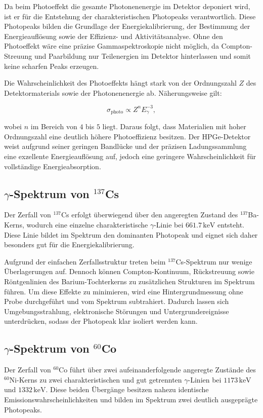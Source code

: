 Da beim Photoeffekt die gesamte Photonenenergie im Detektor deponiert wird, ist er für die
Entstehung der charakteristischen Photopeaks verantwortlich. Diese Photopeaks bilden die
Grundlage der Energiekalibrierung, der Bestimmung der Energieauflösung sowie der
Effizienz- und Aktivitätsanalyse. Ohne den Photoeffekt wäre eine präzise Gammaspektroskopie
nicht möglich, da Compton-Streuung und Paarbildung nur Teilenergien im Detektor
hinterlassen und somit keine scharfen Peaks erzeugen.

Die Wahrscheinlichkeit des Photoeffekts hängt stark von der Ordnungszahl $Z$ des
Detektormaterials sowie der Photonenenergie ab. Näherungsweise gilt:

\[
\sigma_{\mathrm{photo}} \propto Z^n E_\gamma^{-3},
\]

wobei $n$ im Bereich von $4$ bis $5$ liegt. Daraus folgt, dass Materialien mit hoher
Ordnungszahl eine deutlich höhere Photoeffizienz besitzen. Der HPGe-Detektor weist aufgrund seiner geringen Bandlücke und der präzisen Ladungssammlung eine exzellente Energieauflösung auf, jedoch eine geringere Wahrscheinlichkeit für vollständige Energieabsorption.

\subsection{$\gamma$-Spektrum von $^{137}$Cs}

Der Zerfall von $^{137}$Cs erfolgt überwiegend über den angeregten Zustand des
$^{137}$Ba-Kerns, wodurch eine einzelne charakteristische $\gamma$-Linie bei
$661.7\,\mathrm{keV}$ entsteht. Diese Linie bildet im Spektrum den dominanten
Photopeak und eignet sich daher besonders gut für die Energiekalibrierung.

Aufgrund der einfachen Zerfallsstruktur treten beim $^{137}$Cs-Spektrum nur
wenige Überlagerungen auf. Dennoch können Compton-Kontinuum, Rückstreuung
sowie Röntgenlinien des Barium-Tochterkerns zu zusätzlichen Strukturen im
Spektrum führen. Um diese Effekte zu minimieren, wird eine Hintergrundmessung
ohne Probe durchgeführt und vom Spektrum subtrahiert. Dadurch lassen sich
Umgebungsstrahlung, elektronische Störungen und Untergrundereignisse
unterdrücken, sodass der Photopeak klar isoliert werden kann.\cite{Siegbahn}\cite{Knoll}
\subsection{$\gamma$-Spektrum von $^{60}$Co}

Der Zerfall von $^{60}$Co führt über zwei aufeinanderfolgende angeregte Zustände
des $^{60}$Ni-Kerns zu zwei charakteristischen und gut getrennten
$\gamma$-Linien bei $1173\,\mathrm{keV}$ und $1332\,\mathrm{keV}$. Diese beiden
Übergänge besitzen nahezu identische Emissionswahrscheinlichkeiten und bilden
im Spektrum zwei deutlich ausgeprägte Photopeaks.

